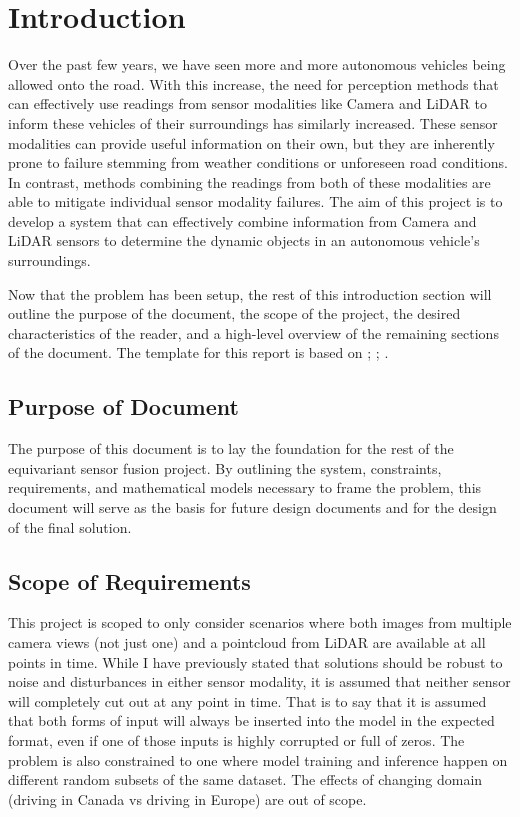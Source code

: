 \documentclass[12pt]{article}
\begin{document}
\newpage


\section{Introduction}

Over the past few years, we have seen more and more autonomous vehicles being allowed onto the road. 
With this increase, the need for perception methods that can effectively use readings from sensor 
modalities like Camera and LiDAR to inform these vehicles of their surroundings has similarly increased.
These sensor modalities can provide useful information on their own, but they are inherently prone
to failure stemming from weather conditions or unforeseen road conditions. In contrast, methods combining the 
readings from both of these modalities are able to mitigate individual sensor modality failures. The aim of 
this project is to develop a system that can effectively combine information from Camera and LiDAR sensors
to determine the dynamic objects in an autonomous vehicle's surroundings.

Now that the problem has been setup, the rest of this introduction section will outline the purpose 
of the document, the scope of the project, the desired characteristics of the reader, and a high-level overview
of the remaining sections of the document. The template for this report is based on \cite{SmithAndLai2005}; \cite{SmithEtAl2007}; \cite{SmithAndKoothoor2016}.


\subsection{Purpose of Document}

The purpose of this document is to lay the foundation for the rest of the equivariant 
sensor fusion project. By outlining the system, constraints, requirements, and mathematical
models necessary to frame the problem, this document will serve as the basis for future design
documents and for the design of the final solution.

\subsection{Scope of Requirements} 

This project is scoped to only consider scenarios where both images from multiple camera views (not just one)
and a pointcloud from LiDAR are available at all points in time. While I have previously stated that solutions should 
be robust to noise and disturbances in either sensor modality, it is assumed that neither sensor will completely cut out 
at any point in time. That is to say that it is assumed that both forms of input will always be inserted into the model 
in the expected format, even if one of those inputs is highly corrupted or full of zeros. 
The problem is also constrained to one where model training and inference happen on different random subsets
of the same dataset. The effects of changing domain (driving in Canada vs driving in Europe) are out of scope.
\end{document}
